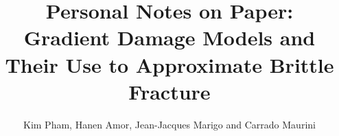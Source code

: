 \documentclass[12pt,3p]{article}
\numberwithin{equation}{section}
\begin{document}
\title{Personal Notes on Paper: \\
	\large{Gradient Damage Models and Their Use to Approximate Brittle Fracture}}
\author{Kim Pham, Hanen Amor, Jean-Jacques Marigo and Carrado Maurini}
\date{\vspace{-5ex}}
\maketitle

\tableofcontents
\newpage
\end{document}

